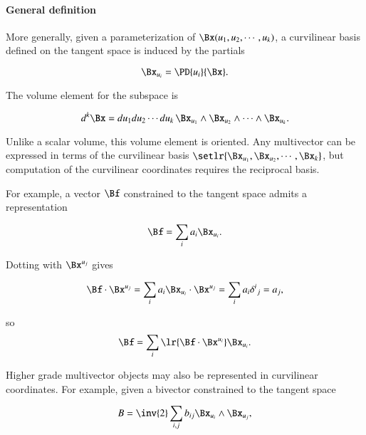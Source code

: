 \paragraph{General definition}

More generally, given a parameterization of \( \Bx(u_1, u_2, \cdots, u_k) \), a curvilinear basis defined on the tangent space is induced by the partials

\begin{dmath}\label{eqn:curvilinearDefined:240}
\Bx_{u_i} = \PD{u_i}{\Bx}.
\end{dmath}

The volume element for the subspace is

\begin{dmath}\label{eqn:curvilinearDefined:260}
d^k \Bx = du_1 du_2 \cdots du_k\,
\Bx_{u_1} \wedge
\Bx_{u_2} \wedge \cdots \wedge
\Bx_{u_k}.
\end{dmath}

Unlike a scalar volume, this volume element is oriented.
Any multivector can be expressed in terms of the curvilinear basis \( \setlr{ \Bx_{u_1}, \Bx_{u_2}, \cdots, \Bx_k} \), but computation of the curvilinear coordinates requires the reciprocal basis.

For example, a vector \( \Bf \) constrained to the tangent space admits a representation

\begin{dmath}\label{eqn:curvilinearDefined:380}
\Bf = \sum_i a_i \Bx_{u_i}.
\end{dmath}

Dotting with \( \Bx^{u_j} \) gives

\begin{dmath}\label{eqn:curvilinearDefined:280}
\Bf \cdot \Bx^{u_j}
= \sum_i a_i \Bx_{u_i} \cdot \Bx^{u_j}
= \sum_i a_i {\delta^i}_j
= a_j,
\end{dmath}

so
\begin{dmath}\label{eqn:curvilinearDefined:300}
\Bf = \sum_i \lr{ \Bf \cdot \Bx^{u_i} } \Bx_{u_i}.
\end{dmath}

Higher grade multivector objects may also be represented in curvilinear coordinates.
For example, given a bivector constrained to the tangent space

\begin{dmath}\label{eqn:curvilinearDefined:320}
B = \inv{2} \sum_{i, j} b_{ij} \Bx_{u_i} \wedge \Bx_{u_j},
\end{dmath}

